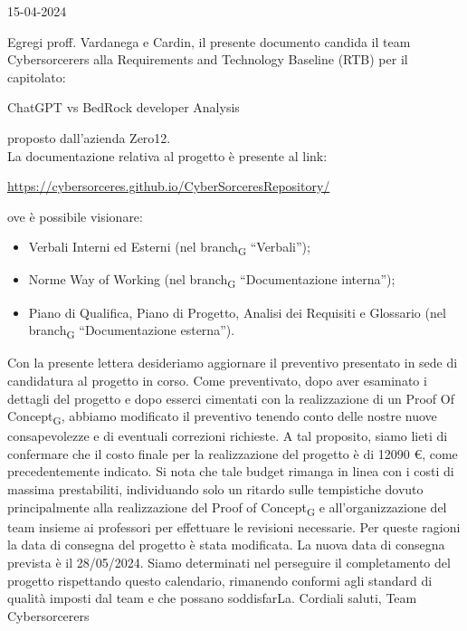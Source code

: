 \documentclass{article}
\begin{document}
\begin{flushright}
15-04-2024
\end{flushright}
Egregi proff. Vardanega e Cardin,
\newline
il presente documento candida il team Cybersorcerers alla Requirements and Technology Baseline (RTB) per il capitolato:\newline
\begin{center}
    ChatGPT vs BedRock developer Analysis
\end{center}
proposto dall’azienda Zero12. \\La documentazione relativa al progetto è presente al link:
\begin{center}
    \href{https://cybersorceres.github.io/CyberSorceresRepository/}{https://cybersorceres.github.io/CyberSorceresRepository/}
\end{center}
ove è possibile visionare:
\begin{itemize}
    \item Verbali Interni ed Esterni (nel branch\textsubscript{G} “Verbali”);
    \item Norme Way of Working (nel branch\textsubscript{G} “Documentazione interna”);
    \item Piano di Qualifica, Piano di Progetto, Analisi dei Requisiti e Glossario (nel branch\textsubscript{G} “Documentazione esterna”).
\end{itemize}

Con la presente lettera desideriamo aggiornare il preventivo presentato in sede di candidatura al progetto in corso. Come preventivato, dopo aver esaminato i dettagli del progetto e dopo esserci cimentati con la realizzazione di un Proof Of Concept\textsubscript{G}, abbiamo modificato il preventivo tenendo conto delle nostre nuove consapevolezze e di eventuali correzioni richieste.
A tal proposito, siamo lieti di confermare che il costo finale per la realizzazione del progetto è di 12090 €, come precedentemente indicato. Si nota che tale budget rimanga in linea con i costi di massima prestabiliti, individuando solo un ritardo sulle tempistiche dovuto principalmente alla realizzazione del Proof of Concept\textsubscript{G} e all'organizzazione del team insieme ai professori per effettuare le revisioni necessarie. Per queste ragioni la data di consegna del progetto è stata modificata. La nuova data di consegna prevista è il 28/05/2024. Siamo determinati nel perseguire il completamento del progetto rispettando questo calendario, rimanendo conformi agli standard di qualità imposti dal team e che possano soddisfarLa. 
\newline
\newline
Cordiali saluti,
\newline
Team Cybersorcerers
\end{document}

